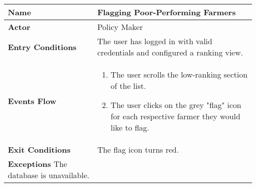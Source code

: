 
\begin{center}
\renewcommand{\arraystretch}{1.25}
\begin{tabular}{|l|>{\raggedright\arraybackslash}m{12cm}|}
    \hline
    \textbf{Name} & Flagging Poor-Performing Farmers\\
    \hline
   	\textbf{Actor} & Policy Maker\\
    \hline
    \textbf{Entry Conditions} & The user has logged in with valid credentials and configured a ranking view.\\
    \hline
    \textbf{Events Flow} & 
    \begin{enumerate}
    	\item The user scrolls the low-ranking section of the list.
    	\item The user clicks on the grey "flag" icon for each respective farmer they would like to flag. 
    \end{enumerate}\\
    \hline
    \textbf{Exit Conditions} & The flag icon turns red.\\
    \hline
    \textbf{Exceptions} The database is unavailable.\\
    \hline
\end{tabular}
\end{center}